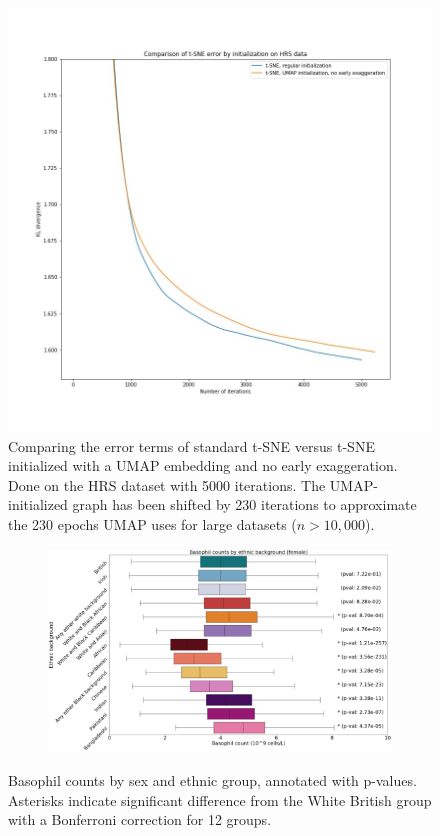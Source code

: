 \documentclass[12pt]{pnas-new}
\begin{document}
\begin{figure}[!htb]
    \centering
    \includegraphics[width=0.95\columnwidth]{images/tsne_umap_graph_hrs.jpeg}
    \caption{Comparing the error terms of standard t-SNE versus t-SNE initialized with a UMAP embedding and no early exaggeration. Done on the HRS dataset with 5000 iterations. The UMAP-initialized graph has been shifted by 230 iterations to approximate the 230 epochs UMAP uses for large datasets ($n>10,000$).}
    \label{fig:supp_tsne_umap_compare_hrs_graph}
\end{figure}




\begin{figure}
    \centering
    \begin{subfigure}{\textwidth}
    \includegraphics[width=\textwidth]{images/female_basophill_boxplot_annotated.pdf}
    \end{subfigure}
    \caption{Basophil counts by sex and ethnic group, annotated with p-values. Asterisks indicate significant difference from the White British group with a Bonferroni correction for 12 groups.}
    \label{fig:supp_box_basophill_f}
\end{figure}
\end{document}
